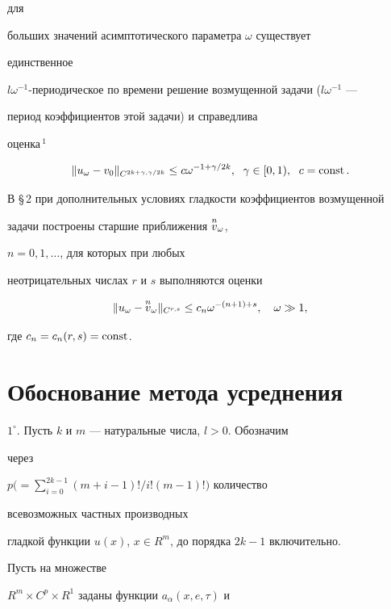 для 


больших значений асимптотического параметра $\omega$ существует 


единственное 


$l \omega^{-1}$-периодическое по времени решение возмущенной задачи ($l 


\omega^{-1}$ --- 


период коэффициентов этой задачи) и справедлива 


оценка$\,^1$ 


$$ 


\|u_\omega-v_0\|_{C^{2k+\gamma,\gamma/2k}}\le 


c\omega^{-1+\gamma/2k},\ \; \gamma\in[0,1),\ \; c=\const. 


$$ 


 


В \S\,2 при дополнительных условиях гладкости коэффициентов возмущенной 


задачи построены старшие приближения $\overset{n}{v}{}_\omega$, 


$n=0,1,\dotsc$, для которых при любых 


неотрицательных числах $r$ и $s$ выполняются оценки 


$$ 


\|u_\omega-\up{n}{v}_\omega\|_{C^{r,s}}\le c_n 


\omega^{-(n+1)+s},\quad \omega\gg1, 


$$ 


где $c_n=c_n(r,s)=\operatorname{const}$. 


 


\section{Обоснование метода усреднения} 


 


$1^\circ$. Пусть $k$ и $m$ --- натуральные числа, $l>0$. Обозначим 


через 


$p\Big(=\sum\limits^{2k-1}_{i=0}(m+i-1)!/i!(m-1)!\Big)$ количество 


всевозможных частных производных 


гладкой функции $u(x)$, $x\in R^m$, до порядка $2k-1$ включительно. 


Пусть на множестве 


$R^m\times C^p\times R^1$ заданы функции $a_\alpha(x,e,\tau)$ и 


